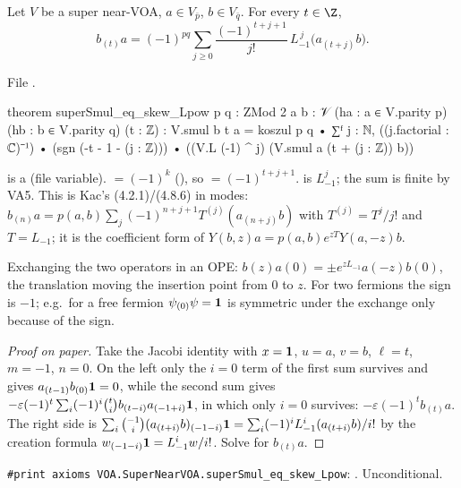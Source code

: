 \begin{theorem}\label{l17:thm:skew}
Let $V$ be a super near-VOA, $a\in V_{\bar p}$, $b\in V_{\bar q}$. For every $t\in\Z$,
\begin{equation*}
b_{(t)}a=(-1)^{pq}\sum_{j\ge0}\frac{(-1)^{t+j+1}}{j!}\,L_{-1}^{\,j}\bigl(a_{(t+j)}b\bigr).
\end{equation*}
\end{theorem}
\noindent File .
\begin{leancode}
theorem superSmul_eq_skew_Lpow {p q : ZMod 2} {a b : 𝒱}
    (ha : a ∈ V.parity p) (hb : b ∈ V.parity q) (t : ℤ) :
    V.smul b t a
      = koszul p q • ∑ᶠ j : ℕ, ((j.factorial : ℂ)⁻¹) •
          (sgn (-t - 1 - (j : ℤ))) •
            ((V.L (-1) ^ j) (V.smul a (t + (j : ℤ)) b))
\end{leancode}
\begin{dictionary}
 is a  (file variable).  $=(-1)^k$ (), so  $=(-1)^{t+j+1}$.  is $L_{-1}^j$; the sum is
finite by VA5. This is Kac's (4.2.1)/(4.8.6) in modes: $b_{(n)}a=p(a,b)\sum_j(-1)^{n+j+1}T^{(j)}(a_{(n+j)}b)$
with $T^{(j)}=T^j/j!$ and $T=L_{-1}$; it is the coefficient form of
$Y(b,z)a=p(a,b)e^{zT}Y(a,-z)b$.
\end{dictionary}
\begin{physics}
Exchanging the two operators in an OPE: $b(z)a(0)=\pm e^{zL_{-1}}a(-z)b(0)$, the translation
moving the insertion point from $0$ to $z$. For two fermions the sign is $-1$; e.g.\ for a free
fermion $\psi_{(0)}\psi=\mathbf{1}$ is symmetric under the exchange only because of the sign.
\end{physics}
\begin{proof}[Proof on paper]
Take the Jacobi identity with $x=\mathbf{1}$, $u=a$, $v=b$, $\ell=t$, $m=-1$, $n=0$. On the left
only the $i=0$ term of the first sum survives and gives $a_{(t-1)}b_{(0)}\mathbf{1}=0$, while the
second sum gives $-\varepsilon(-1)^t\sum_i(-1)^i\binom ti b_{(t-i)}a_{(-1+i)}\mathbf{1}$, in which
only $i=0$ survives: $-\varepsilon(-1)^tb_{(t)}a$. The right side is
$\sum_i\binom{-1}{i}(a_{(t+i)}b)_{(-1-i)}\mathbf{1}=\sum_i(-1)^iL_{-1}^i(a_{(t+i)}b)/i!$ by the
creation formula $w_{(-1-i)}\mathbf{1}=L_{-1}^iw/i!$. Solve for $b_{(t)}a$.
\end{proof}
\begin{status}
\texttt{\#print axioms VOA.SuperNearVOA.superSmul\_eq\_skew\_Lpow}: . Unconditional.
\end{status}

